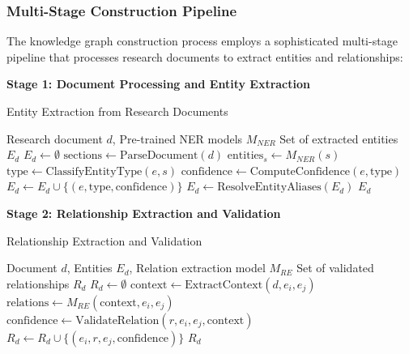 \documentclass[10pt,twocolumn]{article}
\begin{document}
\subsubsection{Multi-Stage Construction Pipeline}

The knowledge graph construction process employs a sophisticated multi-stage pipeline that processes research documents to extract entities and relationships:

\textbf{Stage 1: Document Processing and Entity Extraction}
\begin{algorithm}[H]
\caption{Entity Extraction from Research Documents}
\label{alg:entity_extraction}
\begin{algorithmic}[1]
\REQUIRE Research document $d$, Pre-trained NER models $M_{NER}$
\ENSURE Set of extracted entities $E_d$
\STATE $E_d \leftarrow \emptyset$
\STATE $\text{sections} \leftarrow \text{ParseDocument}(d)$
    \STATE $\text{entities}_s \leftarrow M_{NER}(s)$
        \STATE $\text{type} \leftarrow \text{ClassifyEntityType}(e, s)$
        \STATE $\text{confidence} \leftarrow \text{ComputeConfidence}(e, \text{type})$
            \STATE $E_d \leftarrow E_d \cup \{(e, \text{type}, \text{confidence})\}$
        \ENDIF
    \ENDFOR
\ENDFOR
\STATE $E_d \leftarrow \text{ResolveEntityAliases}(E_d)$
\RETURN $E_d$
\end{algorithmic}
\end{algorithm}

\textbf{Stage 2: Relationship Extraction and Validation}
\begin{algorithm}[H]
\caption{Relationship Extraction and Validation}
\label{alg:relationship_extraction}
\begin{algorithmic}[1]
\REQUIRE Document $d$, Entities $E_d$, Relation extraction model $M_{RE}$
\ENSURE Set of validated relationships $R_d$
\STATE $R_d \leftarrow \emptyset$
    \STATE $\text{context} \leftarrow \text{ExtractContext}(d, e_i, e_j)$
    \STATE $\text{relations} \leftarrow M_{RE}(\text{context}, e_i, e_j)$
        \STATE $\text{confidence} \leftarrow \text{ValidateRelation}(r, e_i, e_j, \text{context})$
            \STATE $R_d \leftarrow R_d \cup \{(e_i, r, e_j, \text{confidence})\}$
        \ENDIF
    \ENDFOR
\ENDFOR
\RETURN $R_d$
\end{algorithmic}
\end{algorithm}
\end{document}
